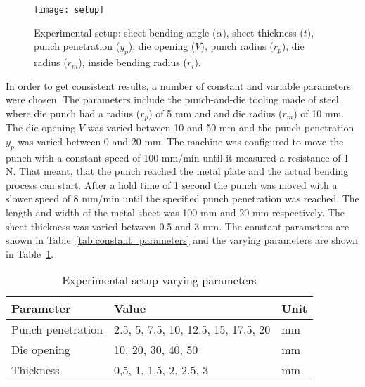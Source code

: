 \begin{figure}[H]
    \centering
    \texttt{[image: setup]}
    \caption{Experimental setup: sheet bending angle ($\alpha$), sheet thickness ($t$), punch penetration ($y_p$), die opening ($V$), punch radius ($r_p$), die radius ($r_m$), inside bending radius ($r_i$).}
    \label{fig:setup}
\end{figure}

In order to get consistent results, a number of constant and variable parameters were chosen.
The parameters include the punch-and-die tooling made of steel where die punch had a radius ($r_p$) of 5 mm and and die radius ($r_m$) of 10 mm. The die opening $V$ was varied between 10 and 50 mm and the punch penetration $y_p$ was varied between 0 and 20 mm.
The machine was configured to move the punch with a constant speed of 100 mm/min until it measured a resistance of 1 N. That meant, that the punch reached the metal plate and the actual bending process can start. After a hold time of 1 second the punch was moved with a slower speed of 8 mm/min until the specified punch penetration was reached.
The length and width of the metal sheet was 100 mm and 20 mm respectively. The sheet thickness was varied between 0.5 and 3 mm.
The constant parameters are shown in Table~\ref{tab:constant_parameters} and the varying parameters are shown in Table~\ref{tab:verying_parameters}.

\begin{table}[H]
    \centering
    \begin{tabular}{|l|l|l|}
        \hline
        \textbf{Parameter} & \textbf{Value}                      & \textbf{Unit} \\ \hline
        Punch penetration  & 2.5, 5, 7.5, 10, 12.5, 15, 17.5, 20 & mm            \\
        Die opening        & 10, 20, 30, 40, 50                  & mm            \\
        Thickness          & 0,5, 1, 1.5, 2, 2.5, 3              & mm            \\
        \hline
    \end{tabular}
    \caption{Experimental setup varying parameters}
    \label{tab:verying_parameters}
\end{table}

